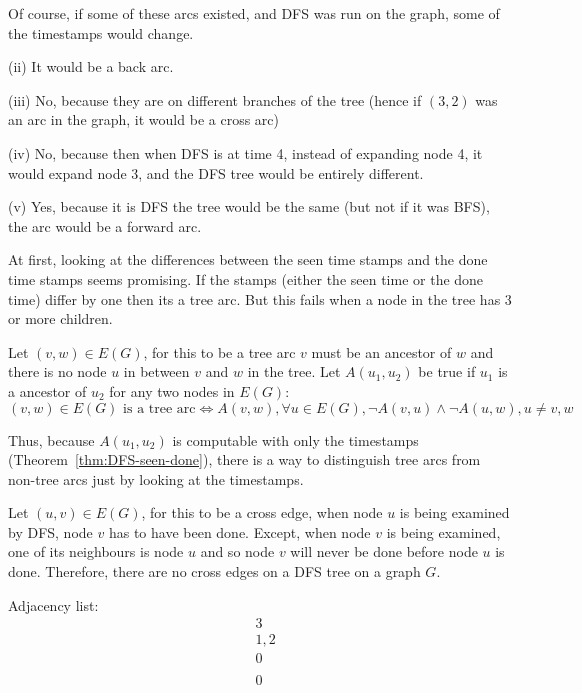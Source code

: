 Of course, if some of these arcs existed, and DFS was run on the graph, some of the 
timestamps would change.
\newline 

\noindent
(ii) It would be a back arc.
\newline

\noindent
(iii) No, because they are on different branches of the tree (hence if \((3,2)\) was 
an arc in the graph, it would be a cross arc)
\newline

\noindent
(iv) No, because then when DFS is at time 4, instead of expanding node 4, it would 
expand node 3, and the DFS tree would be entirely different.
\newline 

\noindent
(v) Yes, because it is DFS the tree would be the same (but not if it was BFS), the 
arc would be a forward arc.


At first, looking at the differences between the seen time stamps and the done time 
stamps seems promising. 
If the stamps (either the seen time or the done time) differ by one then its a tree arc. 
But this fails when a node in 
the tree has 3 or more children.

Let \((v,w) \in E(G)\), for this to be a tree arc \(v\) must be an
ancestor of \(w\) and there is no node \(u\) in between \(v\) and
\(w\) in the tree. Let \(A(u_1,u_2)\) be true if \(u_1\) is a
ancestor of \(u_2\) for any two nodes in \(E(G)\): \[(v,w) \in E(G)
\text{ is a tree arc} \iff A(v,w), \forall u \in E(G), \neg A(v,u)
\wedge \neg A(u,w), u \neq v,w \]

Thus, because \(A(u_1,u_2)\) is computable with only the timestamps
(Theorem~\ref{thm:DFS-seen-done}), there is a way to distinguish tree arcs from non-tree
arcs just by looking at the timestamps.
\fi

Let \((u,v) \in E(G)\), for this to be a cross edge, when node \(u\) is being examined by DFS, node \(v\) has to have 
been done. Except, when node \(v\) is being examined, one of its
neighbours is node \(u\) and so node \(v\) will never 
be done before node \(u\) is done. Therefore, there are no cross edges on a DFS tree on a graph \(G\).

Adjacency list:
\begin{align*}
& 3 \\
& 1,2 \\
& 0 \\
& \\
& 0 \\
\end{align*}

